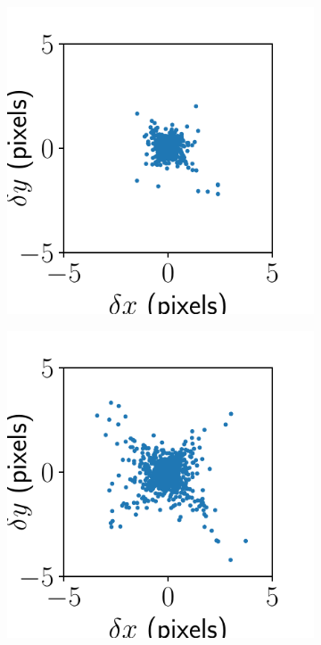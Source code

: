 \documentclass{article}
\begin{document}
\begin{figure}[ht]
\begin{subfigure}{0.24\linewidth}
		\caption{}
		\label{fig:stitchresultbig3}
	\end{subfigure}
	\begin{subfigure}{0.24\linewidth}
		\includegraphics[width=\linewidth]{stitch-result-vectra-big-2.pdf}
		\caption{}
		\label{fig:stitchresultbig2}
	\end{subfigure}
	\begin{subfigure}{0.24\linewidth}
		\includegraphics[width=\linewidth]{stitch-result-vectra-big-1.pdf}

\end{subfigure}
\end{figure}
\end{document}
